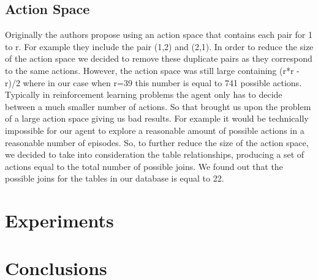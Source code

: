 \documentclass[sigconf,10pt,preprint]{acmart}
\begin{document}
\subsection{Action Space}

Originally the authors propose using an action space that contains each pair for 1 to r. For example they include the pair (1,2) and (2,1). In order to reduce the size of the action space we decided to remove these duplicate pairs as they correspond to the same actions. However,  the action space was still large containing (r*r -r)/2 where in our case when r=39 this number is equal to 741 possible actions. Typically in reinforcement learning problems the agent only has to decide between a much smaller number of actions. So that brought us upon the problem of a large action space giving us bad results. For example it would be technically impossible for our agent to explore a reasonable amount of possible actions in a reasonable number of episodes. So, to further reduce the size of the action space, we decided to take into consideration the table relationships, producing a set of actions equal to the total number of possible joins. We found out that the possible joins for the tables in our database is equal to 22.

\section{Experiments}
\label{experiments}



\section{Conclusions}
\label{conclusions}




\end{document}
